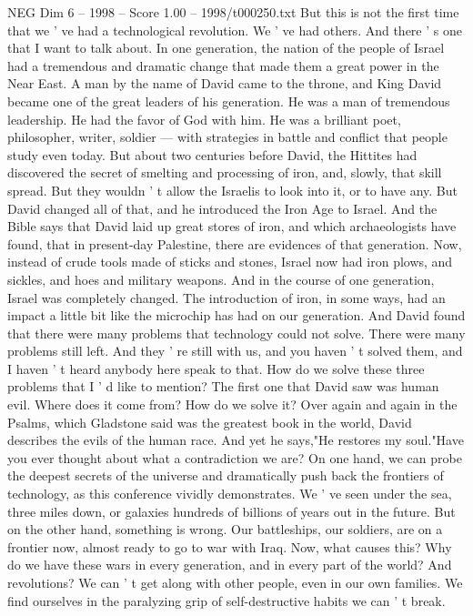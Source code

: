 \begin{textsample}{NEG Dim 6 – 1998 – Score 1.00 – 1998/t000250.txt}
But this is not the first time that we ' ve had a technological revolution.
We ' ve had others.
And there ' s one that I want to talk about.
In one generation, the nation of the people of Israel had a tremendous and dramatic change that made them a great power in the Near East.
A man by the name of David came to the throne, and King David became one of the great leaders of his generation.
He was a man of tremendous leadership.
He had the favor of God with him.
He was a brilliant poet, philosopher, writer, soldier — with strategies in battle and conflict that people study even today.
But about two centuries before David, the Hittites had discovered the secret of smelting and processing of iron, and, slowly, that skill spread.
But they wouldn ' t allow the Israelis to look into it, or to have any.
But David changed all of that, and he introduced the Iron Age to Israel.
And the Bible says that David laid up great stores of iron, and which archaeologists have found, that in present-day Palestine, there are evidences of that generation.
Now, instead of crude tools made of sticks and stones, Israel now had iron plows, and sickles, and hoes and military weapons.
And in the course of one generation, Israel was completely changed.
The introduction of iron, in some ways, had an impact a little bit like the microchip has had on our generation.
And David found that there were many problems that technology could not solve.
There were many problems still left.
And they ' re still with us, and you haven ' t solved them, and I haven ' t heard anybody here speak to that.
How do we solve these three problems that I ' d like to mention?
The first one that David saw was human evil.
Where does it come from?
How do we solve it?
Over again and again in the Psalms, which Gladstone said was the greatest book in the world, David describes the evils of the human race.
And yet he says,"He restores my soul."Have you ever thought about what a contradiction we are?
On one hand, we can probe the deepest secrets of the universe and dramatically push back the frontiers of technology, as this conference vividly demonstrates.
We ' ve seen under the sea, three miles down, or galaxies hundreds of billions of years out in the future.
But on the other hand, something is wrong.
Our battleships, our soldiers, are on a frontier now, almost ready to go to war with Iraq.
Now, what causes this?
Why do we have these wars in every generation, and in every part of the world?
And revolutions?
We can ' t get along with other people, even in our own families.
We find ourselves in the paralyzing grip of self-destructive habits we can ' t break.

\end{textsample}
